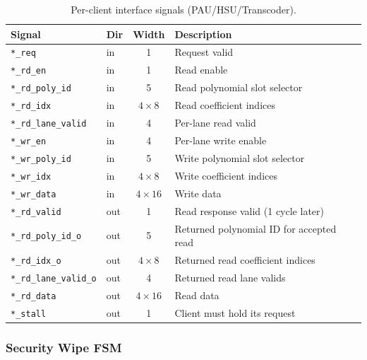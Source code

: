 \documentclass[11pt,letterpaper]{article}
\begin{document}
\begin{table}[H]
\centering
\caption{Per-client interface signals (PAU/HSU/Transcoder).}
\label{tab:client_if}
\begin{tabular}{@{}llcl@{}}
\toprule
\textbf{Signal} & \textbf{Dir} & \textbf{Width} & \textbf{Description} \\
\midrule
\texttt{*\_req}            & in  & 1        & Request valid \\
\texttt{*\_rd\_en}         & in  & 1        & Read enable \\
\texttt{*\_rd\_poly\_id}   & in  & 5        & Read polynomial slot selector \\
\texttt{*\_rd\_idx}        & in  & $4\times8$ & Read coefficient indices \\
\texttt{*\_rd\_lane\_valid} & in & 4        & Per-lane read valid \\
\texttt{*\_wr\_en}         & in  & 4        & Per-lane write enable \\
\texttt{*\_wr\_poly\_id}   & in  & 5        & Write polynomial slot selector \\
\texttt{*\_wr\_idx}        & in  & $4\times8$ & Write coefficient indices \\
\texttt{*\_wr\_data}       & in  & $4\times16$ & Write data \\
\texttt{*\_rd\_valid}      & out & 1        & Read response valid (1 cycle later) \\
\texttt{*\_rd\_poly\_id\_o} & out & 5       & Returned polynomial ID for accepted read \\
\texttt{*\_rd\_idx\_o}     & out & $4\times8$ & Returned read coefficient indices \\
\texttt{*\_rd\_lane\_valid\_o} & out & 4    & Returned read lane valids \\
\texttt{*\_rd\_data}       & out & $4\times16$ & Read data \\
\texttt{*\_stall}          & out & 1        & Client must hold its request \\
\bottomrule
\end{tabular}
\end{table}

\subsubsection{Security Wipe FSM}
\end{document}
